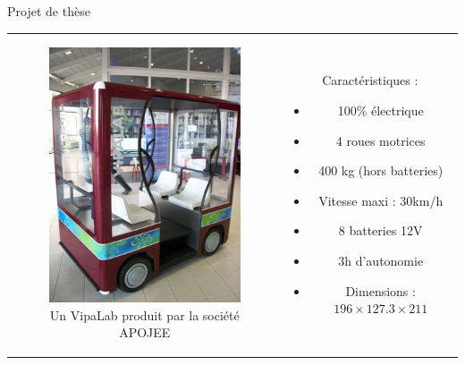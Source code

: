 \documentclass{beamer}
\begin{document}
\begin{frame}{Projet de thèse}
  \begin{tabular}{c c}
    \begin{minipage}{0.5\linewidth}
      \begin{figure}
        \includegraphics[width=0.8\linewidth]{images/VIPALAB.jpg}
        \caption{Un VipaLab produit par la société APOJEE}
      \end{figure}
    \end{minipage}
    &
    \begin{minipage}{0.5\linewidth}
      Caractéristiques :
      \begin{itemize}
      \item 100\% électrique
      \item 4 roues motrices
      \item 400 kg (hors batteries)
      \item Vitesse maxi : 30km/h
      \item 8 batteries 12V
      \item 3h d'autonomie
      \item Dimensions : $196\times127.3\times211$
      \end{itemize}
    \end{minipage}
  \end{tabular}
%
\end{frame}
\end{document}
